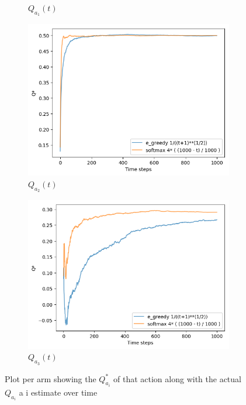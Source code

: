 \documentclass[letterpaper]{article}
\begin{document}
\begin{figure}[H]
\begin{subfigure}{.5\textwidth}
    \caption{$Q_{a_{1}}(t)$}
    \label{fig:qta_1_ex3}
  \end{subfigure}
  \begin{subfigure}{.5\textwidth}
    \centering
    \includegraphics[width=1\linewidth]{images/assign3/ex3/qta_2}
    \caption{$Q_{a_{2}}(t)$}
    \label{fig:qta_2_ex3}
  \end{subfigure}
  \begin{subfigure}{.5\textwidth}
    \centering
    \includegraphics[width=1\linewidth]{images/assign3/ex3/qta_3}
    \caption{$Q_{a_{3}}(t)$}
    \label{fig:qta_3_ex3}
  \end{subfigure}

    \caption{Plot per arm showing
    the $Q^{*}_{a_{i}}$
    of that action along with the actual $Q_{a_{i}}$ a i estimate over time}
    \label{fig:qtas_ex3}
\end{figure}
\end{document}
